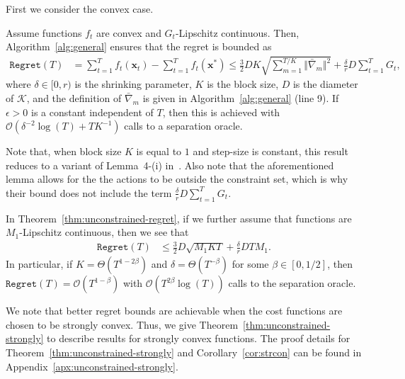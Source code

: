 \documentclass[twoside,11pt,]{article}
\newcommand{\C}[1]{\mathcal{#1}}
\newcommand{\BF}[1]{\mathbf{#1}}
\newcommand{\K}{\C{K}}
\newcommand{\x}{\BF{x}}
\newcommand{\sumT}{\sum\limits_{t=1}^T}
\newcommand{\bn}{\bar{\nabla}}
\renewcommand{\cite}[1]{\citep{#1}}
\begin{document}
First we consider the convex case.
\begin{theorem}
\label{thm:unconstrained-regret}
Assume functions $f_t$ are convex and $G_t$-Lipschitz continuous. 
Then, Algorithm~\ref{alg:general} ensures that the regret is bounded as
\begin{align*}
\mathtt{Regret}(T) &= \sum_{t=1}^T f_t(\x_t) - \sum_{t=1}^T f_t(\x^*) 
\leq \frac{3}{2} D K \sqrt{\sum_{m=1}^{T/K} \Vert \bar{\nabla}_m \Vert ^2} + \frac{\delta}{r} D \sumT G_t,
\end{align*}
where $\delta \in [0,r)$ is the shrinking parameter, $K$ is the block size, $D$ is the diameter of $\K$, and the definition of $\bn_m$ is given in Algorithm~\ref{alg:general} (line 9).
If $\epsilon > 0$ is a constant independent of $T$, then this is achieved with $\C{O}\left( \delta^{-2} \log(T) + T K^{-1} \right)$ calls to a separation oracle.
\end{theorem}

Note that, when block size $K$ is equal to $1$ and step-size is constant, this result reduces to a variant of Lemma~4-(i) in~\cite{garber2022new}.
Also note that the aforementioned lemma allows for the the actions to be outside the constraint set, which is why their bound does not include the term $\frac{\delta}{r} D  \sum_{t=1}^T G_t$.

\begin{corollary}
\label{cor:con}
In Theorem~\ref{thm:unconstrained-regret}, if we further assume that functions are $M_1$-Lipschitz continuous, then we see that
\begin{align*}
\mathtt{Regret}(T) 
&\leq \frac{3}{2} D \sqrt{M_1 K T} + \frac{\delta}{r} D T M_1.
\end{align*}
In particular, if $K = \Theta(T^{1 - 2\beta})$ and $\delta = \Theta(T^{-\beta})$ for some $\beta \in [0, 1/2]$, then $\mathtt{Regret}(T) = \C{O}(T^{1 - \beta})$ with $\C{O}(T^{2\beta}\log(T))$ calls to the separation oracle.
\end{corollary}





We note that better regret bounds are achievable when the cost functions are chosen to be strongly convex. 
Thus, we give Theorem~\ref{thm:unconstrained-strongly} to describe results for strongly convex functions. 
The proof details for Theorem~\ref{thm:unconstrained-strongly} and Corollary~\ref{cor:strcon} can be found in Appendix~\ref{apx:unconstrained-strongly}.
\end{document}
